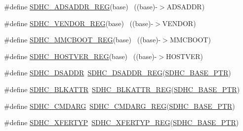 \begin{DoxyCompactItemize}
\item 
\#define \hyperlink{group___s_d_h_c___register___accessor___macros_gae32c413fbc608f59a73a1298495f020e}{S\+D\+H\+C\+\_\+\+A\+D\+S\+A\+D\+D\+R\+\_\+\+R\+EG}(base)                                  ~((base)-\/$>$A\+D\+S\+A\+D\+DR)
\item 
\#define \hyperlink{group___s_d_h_c___register___accessor___macros_ga7e091accba9ca2dbbbae18bc8e435d2c}{S\+D\+H\+C\+\_\+\+V\+E\+N\+D\+O\+R\+\_\+\+R\+EG}(base)                                    ~((base)-\/$>$V\+E\+N\+D\+OR)
\item 
\#define \hyperlink{group___s_d_h_c___register___accessor___macros_gaee891df0b751b3a18a43a02d003520be}{S\+D\+H\+C\+\_\+\+M\+M\+C\+B\+O\+O\+T\+\_\+\+R\+EG}(base)                                  ~((base)-\/$>$M\+M\+C\+B\+O\+OT)
\item 
\#define \hyperlink{group___s_d_h_c___register___accessor___macros_ga83483fda8037182255e387b289c4324f}{S\+D\+H\+C\+\_\+\+H\+O\+S\+T\+V\+E\+R\+\_\+\+R\+EG}(base)                                  ~((base)-\/$>$H\+O\+S\+T\+V\+ER)
\item 
\#define \hyperlink{group___s_d_h_c___register___accessor___macros_ga49ef29273fdcfe72894e1c09705d03e1}{S\+D\+H\+C\+\_\+\+D\+S\+A\+D\+DR}~\hyperlink{group___s_d_h_c___register___accessor___macros_gaff5fe2696bbe46c19405b9a26bade43b}{S\+D\+H\+C\+\_\+\+D\+S\+A\+D\+D\+R\+\_\+\+R\+EG}(\hyperlink{group___s_d_h_c___peripheral_gaf6d94732d48040eef799143f86be859c}{S\+D\+H\+C\+\_\+\+B\+A\+S\+E\+\_\+\+P\+TR})
\item 
\#define \hyperlink{group___s_d_h_c___register___accessor___macros_gafa818e67c7cadfe5b37cbfd95e0f2a92}{S\+D\+H\+C\+\_\+\+B\+L\+K\+A\+T\+TR}~\hyperlink{group___s_d_h_c___register___accessor___macros_ga4e25f7d2c643d77255560ebe463e2e83}{S\+D\+H\+C\+\_\+\+B\+L\+K\+A\+T\+T\+R\+\_\+\+R\+EG}(\hyperlink{group___s_d_h_c___peripheral_gaf6d94732d48040eef799143f86be859c}{S\+D\+H\+C\+\_\+\+B\+A\+S\+E\+\_\+\+P\+TR})
\item 
\#define \hyperlink{group___s_d_h_c___register___accessor___macros_gac380458d7fad09c412cfeb37195a6251}{S\+D\+H\+C\+\_\+\+C\+M\+D\+A\+RG}~\hyperlink{group___s_d_h_c___register___accessor___macros_gab64cab6a76d88f1503d93bc85a8c6b8e}{S\+D\+H\+C\+\_\+\+C\+M\+D\+A\+R\+G\+\_\+\+R\+EG}(\hyperlink{group___s_d_h_c___peripheral_gaf6d94732d48040eef799143f86be859c}{S\+D\+H\+C\+\_\+\+B\+A\+S\+E\+\_\+\+P\+TR})
\item 
\#define \hyperlink{group___s_d_h_c___register___accessor___macros_ga9ea4af444695b7c4f459ea3f98ee5a79}{S\+D\+H\+C\+\_\+\+X\+F\+E\+R\+T\+YP}~\hyperlink{group___s_d_h_c___register___accessor___macros_ga563a47325e0aa457d7b61679cfe69a53}{S\+D\+H\+C\+\_\+\+X\+F\+E\+R\+T\+Y\+P\+\_\+\+R\+EG}(\hyperlink{group___s_d_h_c___peripheral_gaf6d94732d48040eef799143f86be859c}{S\+D\+H\+C\+\_\+\+B\+A\+S\+E\+\_\+\+P\+TR})

\end{DoxyCompactItemize}
